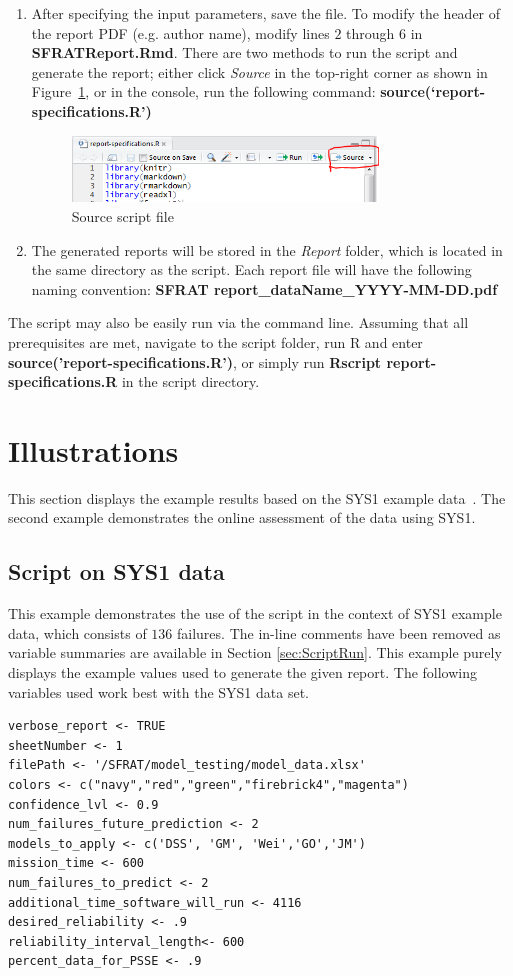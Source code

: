 \documentclass[conference]{IEEEtran}
\begin{document}
\begin{enumerate}
  \item{After specifying the input parameters, save the file. To modify the header of the report PDF (e.g. author name), modify lines $2$ through $6$ in \textbf{SFRATReport.Rmd}. There are two methods to run the script and generate the report; either click \textit{Source} in the top-right corner as shown in Figure~\ref{fig:scriptsource}, or in the console, run the following command: \textbf{source(‘report-specifications.R’)}
	\begin{figure}[!h]
	\centering
	\includegraphics[width=3.2in]{Figures/scriptsource}
	\caption{Source script file}
	\label{fig:scriptsource}
	\end{figure}
}

  \item {The generated reports will be stored in the \textit{Report} folder, which is located in the same directory as the script. Each report file will have the following naming convention: 
  \newline
  \textbf{SFRAT report\_dataName\_YYYY-MM-DD.pdf}}
\end{enumerate}
The script may also be easily run via the command line. Assuming that all prerequisites are met, navigate to the script folder, run R and enter \textbf{source('report-specifications.R')}, or simply run \textbf{Rscript report-specifications.R} in the script directory.

\section{Illustrations}\label{sec:Ex}
This section displays the example results based on the SYS1 example data~\cite{BookHoSRE}. The second example demonstrates the online assessment of the data using SYS1.

\subsection{Script on SYS1 data}\label{sec:Ex:Script}
This example demonstrates the use of the script in the context of SYS1 example data, which consists of $136$ failures. The in-line comments have been removed as variable summaries are available in Section \ref{sec:ScriptRun}. This example purely displays the example values used to generate the given report. The following variables used work best with the SYS1 data set.
\begin{lstlisting}
verbose_report <- TRUE								
sheetNumber <- 1
filePath <- '/SFRAT/model_testing/model_data.xlsx'
colors <- c("navy","red","green","firebrick4","magenta")
confidence_lvl <- 0.9
num_failures_future_prediction <- 2	
models_to_apply <- c('DSS', 'GM', 'Wei','GO','JM')
mission_time <- 600
num_failures_to_predict <- 2
additional_time_software_will_run <- 4116
desired_reliability <- .9
reliability_interval_length<- 600
percent_data_for_PSSE <- .9
	
\end{lstlisting}
\end{document}
